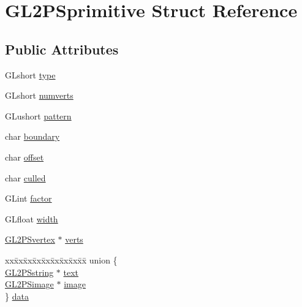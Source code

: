 \hypertarget{struct_g_l2_p_sprimitive}{}\section{G\+L2\+P\+Sprimitive Struct Reference}
\label{struct_g_l2_p_sprimitive}
\subsection*{Public Attributes}
\begin{DoxyCompactItemize}
\item 
G\+Lshort \hyperlink{struct_g_l2_p_sprimitive_a760f35c02d70a961d9a1e2c39f083136}{type}
\item 
G\+Lshort \hyperlink{struct_g_l2_p_sprimitive_a0c08e03e33ce4a72b2a0ffa1af80621c}{numverts}
\item 
G\+Lushort \hyperlink{struct_g_l2_p_sprimitive_a60f7dcbf793edb8c10f617e77a817c33}{pattern}
\item 
char \hyperlink{struct_g_l2_p_sprimitive_a1888e49651c47c98848b80287eeb6ab1}{boundary}
\item 
char \hyperlink{struct_g_l2_p_sprimitive_a17d640d1108f03b6e57c9a4705266944}{offset}
\item 
char \hyperlink{struct_g_l2_p_sprimitive_a4df4eaa4723bf58404efa81e600a8fc9}{culled}
\item 
G\+Lint \hyperlink{struct_g_l2_p_sprimitive_a668f776cc038ba6697fb3a59ac9808d8}{factor}
\item 
G\+Lfloat \hyperlink{struct_g_l2_p_sprimitive_aebf18baa0efe97f7e57bef844d998d76}{width}
\item 
\hyperlink{struct_g_l2_p_svertex}{G\+L2\+P\+Svertex} $\ast$ \hyperlink{struct_g_l2_p_sprimitive_a8e2aec50f1c86078f89a930588f30f0c}{verts}
\item 
\begin{tabbing}
xx\=xx\=xx\=xx\=xx\=xx\=xx\=xx\=xx\=\kill
union \{\\
\>\hyperlink{struct_g_l2_p_sstring}{GL2PSstring} $\ast$ \hyperlink{struct_g_l2_p_sprimitive_af54b8ee11bcb5cc40daed4f311597053}{text}\\
\>\hyperlink{struct_g_l2_p_simage}{GL2PSimage} $\ast$ \hyperlink{struct_g_l2_p_sprimitive_aeb241b576955f15767567f8f12d82088}{image}\\
\} \hyperlink{struct_g_l2_p_sprimitive_a2c12b330fa11b03312e248a8864099b5}{data}\\

\end{tabbing}\end{DoxyCompactItemize}


